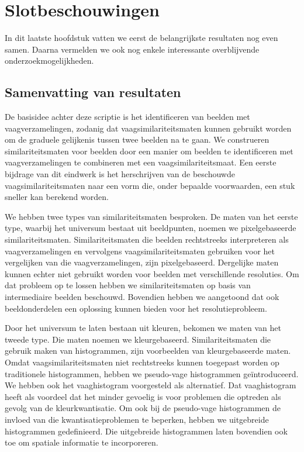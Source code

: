 \chapter{Slotbeschouwingen}

In dit laatste hoofdstuk vatten we eerst de belangrijkste resultaten
nog even samen. Daarna vermelden we ook nog enkele interessante overblijvende
onderzoekmogelijkheden.

\section{Samenvatting van resultaten}

De basisidee achter deze scriptie is het identificeren van beelden
met vaagverzamelingen, zodanig dat vaagsimilariteitsmaten kunnen gebruikt worden
om de graduele gelijkenis tussen twee beelden na te gaan. 
We construeren similariteitsmaten voor beelden door een manier om beelden te
identificeren met vaagverzamelingen te combineren met een vaagsimilariteitsmaat.
Een eerste bijdrage van dit eindwerk is het herschrijven van de beschouwde
vaagsimilariteitsmaten naar een vorm die, onder bepaalde voorwaarden, een stuk
sneller kan berekend worden. 

We hebben twee types van similariteitsmaten besproken.
De maten van het eerste type, waarbij het universum bestaat uit beeldpunten, 
noemen we pixelgebaseerde similariteitsmaten. Similariteitsmaten die 
beelden rechtstreeks interpreteren als vaagverzamelingen en vervolgens 
vaagsimilariteitsmaten gebruiken voor het vergelijken van die vaagverzamelingen, 
zijn pixelgebaseerd. Dergelijke maten kunnen echter niet gebruikt worden voor 
beelden met verschillende resoluties. Om dat probleem op te lossen hebben we 
similariteitsmaten op basis van intermediaire beelden beschouwd. Bovendien 
hebben we aangetoond dat ook beeldonderdelen een oplossing kunnen bieden voor 
het resolutieprobleem. 

Door het universum te laten bestaan uit kleuren, bekomen we maten van het tweede
type. Die maten noemen we kleurgebaseerd. Similariteitsmaten
die gebruik maken van histogrammen, zijn voorbeelden van kleurgebaseerde 
maten. Omdat vaagsimilariteitsmaten niet rechtstreeks kunnen
toegepast worden op traditionele histogrammen, hebben we pseudo-vage histogrammen
ge\"introduceerd. We hebben ook het vaaghistogram voorgesteld als alternatief.
Dat vaaghistogram heeft als voordeel dat het minder gevoelig is voor
problemen die optreden als gevolg van de kleurkwantisatie. Om ook bij de pseudo-vage
histogrammen de invloed van die kwantisatieproblemen te beperken, hebben we 
uitgebreide histogrammen gedefinieerd. Die uitgebreide histogrammen laten bovendien
ook toe om spatiale informatie te incorporeren.

